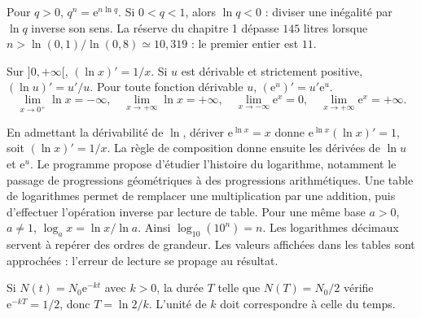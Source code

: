Pour $q>0$, $q^n=\mathrm e^{n\ln q}$. Si $0<q<1$, alors $\ln q<0$ : diviser une inégalité par $\ln q$ inverse son sens.
La réserve du chapitre 1 dépasse $145$ litres lorsque
$n>\ln(0{,}1)/\ln(0{,}8)\simeq10{,}319$ : le premier entier est $11$.
\begin{propriete}
Sur $]0,+\infty[$, $(\ln x)'=1/x$. Si $u$ est dérivable et strictement positive, $(\ln u)'=u'/u$.
Pour toute fonction dérivable $u$, $(\mathrm e^u)'=u'\mathrm e^u$.
\[\lim_{x\to0^+}\ln x=-\infty,\quad \lim_{x\to+\infty}\ln x=+\infty,
\quad \lim_{x\to-\infty}\mathrm e^x=0,\quad \lim_{x\to+\infty}\mathrm e^x=+\infty.\]
\end{propriete}
En admettant la dérivabilité de $\ln$, dériver $\mathrm e^{\ln x}=x$ donne $\mathrm e^{\ln x}(\ln x)'=1$, soit $(\ln x)'=1/x$.
La règle de composition donne ensuite les dérivées de $\ln u$ et $\mathrm e^u$.
Le programme propose d'étudier l'histoire du logarithme, notamment le passage de progressions géométriques à des progressions arithmétiques. Une table de logarithmes permet de remplacer une multiplication par une addition, puis d'effectuer l'opération inverse par lecture de table.
Pour une même base $a>0$, $a\ne1$, $\log_a x=\ln x/\ln a$. Ainsi $\log_{10}(10^n)=n$.
Les logarithmes décimaux servent à repérer des ordres de grandeur. Les valeurs affichées dans les tables sont approchées : l'erreur de lecture se propage au résultat.
\begin{exemple}
Si $N(t)=N_0\mathrm e^{-kt}$ avec $k>0$, la durée $T$ telle que $N(T)=N_0/2$ vérifie $\mathrm e^{-kT}=1/2$, donc $T=\ln2/k$. L'unité de $k$ doit correspondre à celle du temps.
\end{exemple}

